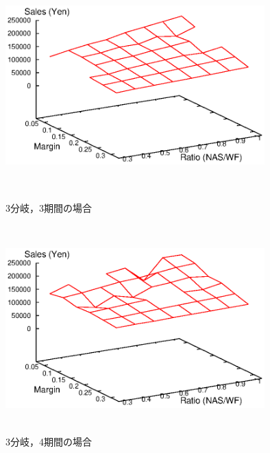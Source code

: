 \documentclass[a4paper,12pt,showkeys]{jreport}
\begin{document}
\begin{figure}[]
 \begin{minipage}{0.5\hsize}
  \begin{center}
   \includegraphics[width=10cm,height=8cm, clip]{stdout_C3_T3_data_m.eps}
  \end{center}
  \caption{3分岐，3期間の場合}
  \label{fig:C3_T3}
 \end{minipage}
 \begin{minipage}{0.5\hsize}
  \begin{center}
   \includegraphics[width=10cm,height=8cm, clip]{stdout_C3_T4_data_m.eps}
  \end{center}
   \caption{3分岐，4期間の場合}
  \label{fig:C3_T4}
 \end{minipage}
\end{figure}
\end{document}
